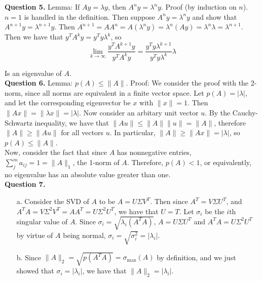 \documentclass{article}
\newcommand{\ra}{\longrightarrow}
\begin{document}
\textbf{Question 5.} Lemma: If $Ay = \lambda y $, then $A^n y = \lambda^n y$. Proof (by induction on $n$). $n=1$ is handled in the definition. Then suppose $A^n y = \lambda^n y$ and show that $A^{n+1}y= \lambda^{n+1}y$. Then $A^{n+1}=AA^n = A(\lambda^n y) = \lambda^n (Ay) = \lambda^n \lambda = \lambda^{n+1}$. Then we have that $y^T A^k y = y^T y\lambda^k$, so 
\begin{equation*}
    \lim_{k \ra \infty} \frac{y^T A^{k+1}y}{y^T A^k y} = \frac{y^T y \lambda^{k+1}}{y^T y \lambda^k} \lambda 
\end{equation*}

Is an eigenvalue of $A$. \\

\textbf{Question 6.} Lemma: $p(A) \leq \|A\|$. Proof: We consider the proof with the 2-norm, since all norms are equivalent in a finite vector space. Let $p(A) = |\lambda|$, and let the corresponding eigenvector be $x$ with $\|x\| = 1$. Then $\|Ax\| = \|\lambda x\| = |\lambda|$. Now consider an arbitary unit vector $u$. By the Cauchy-Schwartz inequality, we have that $\|Au\| \leq \|A\| \|u\| = \|A\|$, therefore $\|A \| \geq \|A u\|$ for all vectors $u$. In particular, $\|A\| \geq \|Ax\| = |\lambda|$, so $p(A) \leq \|A\|$. \\

Now, consider the fact that since $A$ has nonnegative entries, $\sum_{j}^m a_{ij}=1=\|A\|_1$, the 1-norm of $A$. Therefore, $p(A) < 1$, or equivalently, no eigenvalue has an absolute value greater than one. \\

\textbf{Question 7.} 
\begin{itemize}
    \item[a.] Consider the SVD of $A$ to be $A=U\Sigma V^T$. Then since $A^T = V\Sigma U^T$, and $A^TA = V\Sigma^2 V^T = AA^T = U\Sigma^2U^T$, we have that $U=T$. Let $\sigma_i$ be the $i$th singular value of $A$. Since $\sigma_i = \sqrt{\lambda_i(A^TA)}$, $A = U\Sigma U^T$ and  $A^TA = U\Sigma^2 U^T$ by virtue of $A$ being normal, $\sigma_i = \sqrt{\sigma_i^2} = |\lambda_i|$. 
    \item[b.] Since $\|A\|_2 = \sqrt{p(A^TA)} = \sigma_{\max}(A)$ by definition, and we just showed that $\sigma_i = |\lambda_i|$, we have that $\|A\|_2 = |\lambda_i|$. 
\end{itemize}
\end{document}
